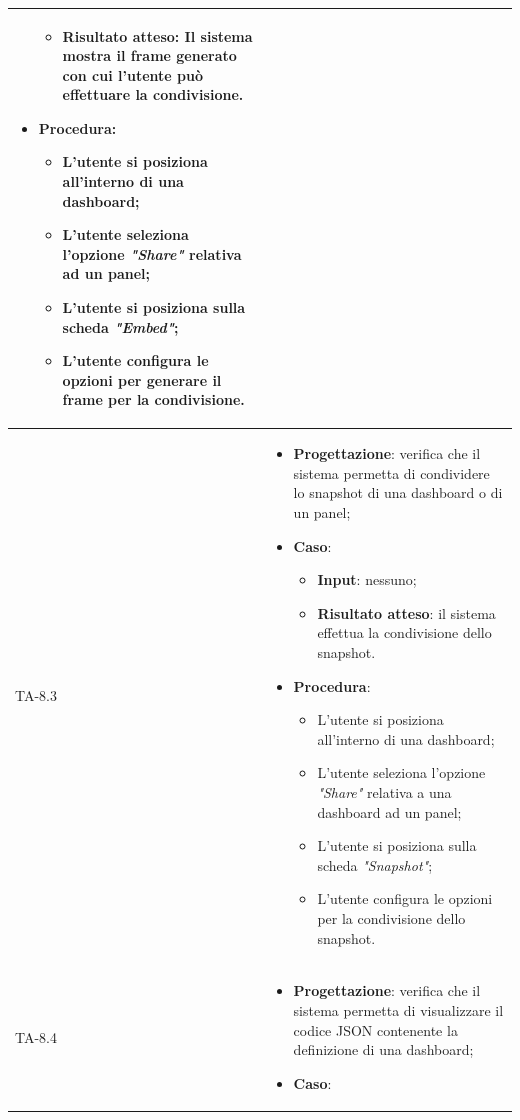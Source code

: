 \begin{longtable}{|C{2.5cm}|C{13cm}|}
\begin{itemize}
\begin{itemize}
		\item \textbf{Risultato atteso}: Il sistema mostra il frame generato con cui l'utente può effettuare la condivisione.
	\end{itemize}
	\item \textbf{Procedura}:
	\begin{itemize}
		\item L'utente si posiziona all'interno di una dashboard;
		\item L'utente seleziona l'opzione \emph{"Share"} relativa ad un panel;
		\item L'utente si posiziona sulla scheda \emph{"Embed"};
		\item L'utente configura le opzioni per generare il frame per la condivisione.
	\end{itemize} 
\end{itemize}\\
\hline
{TA-8.3} &
\begin{itemize}
	\item \textbf{Progettazione}: verifica che il sistema permetta di condividere lo snapshot di una dashboard o di un
	panel;
	\item \textbf{Caso}: 
	\begin{itemize}
		\item \textbf{Input}: nessuno;
		\item \textbf{Risultato atteso}: il sistema effettua la condivisione dello snapshot.
	\end{itemize}
	\item \textbf{Procedura}:
	\begin{itemize}
		\item L'utente si posiziona all'interno di una dashboard;
		\item L'utente seleziona l'opzione \emph{"Share"} relativa a una dashboard ad un panel;
		\item L'utente si posiziona sulla scheda \emph{"Snapshot"};
		\item L'utente configura le opzioni per la condivisione dello snapshot.
	\end{itemize} 
\end{itemize}\\
\hline
{TA-8.4} &
\begin{itemize}
	\item \textbf{Progettazione}: verifica che il sistema permetta di visualizzare il codice JSON contenente la definizione
	di una dashboard;
	\item \textbf{Caso}: 
	\begin{itemize}

\end{itemize}
\end{itemize}
\end{longtable}
